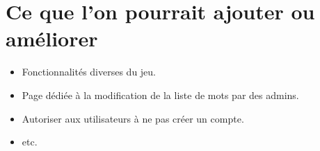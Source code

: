 \documentclass[11pt,a4paper]{article}
\begin{document}
    \section{Ce que l'on pourrait ajouter ou améliorer}
        \begin{itemize}
            \item Fonctionnalités diverses du jeu.
            \item Page dédiée à la modification de la liste de mots par des admins.
            \item Autoriser aux utilisateurs à ne pas créer un compte.
            \item etc.
        \end{itemize}
\end{document}
